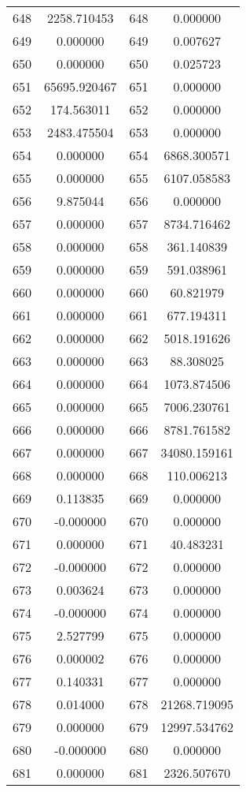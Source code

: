 \documentclass[12pt]{article}
\begin{document}
\begin{longtable}{@{}cccc@{}}
648 & 2258.710453 & 648 & 0.000000 \\
649 & 0.000000 & 649 & 0.007627 \\
650 & 0.000000 & 650 & 0.025723 \\
651 & 65695.920467 & 651 & 0.000000 \\
652 & 174.563011 & 652 & 0.000000 \\
653 & 2483.475504 & 653 & 0.000000 \\
654 & 0.000000 & 654 & 6868.300571 \\
655 & 0.000000 & 655 & 6107.058583 \\
656 & 9.875044 & 656 & 0.000000 \\
657 & 0.000000 & 657 & 8734.716462 \\
658 & 0.000000 & 658 & 361.140839 \\
659 & 0.000000 & 659 & 591.038961 \\
660 & 0.000000 & 660 & 60.821979 \\
661 & 0.000000 & 661 & 677.194311 \\
662 & 0.000000 & 662 & 5018.191626 \\
663 & 0.000000 & 663 & 88.308025 \\
664 & 0.000000 & 664 & 1073.874506 \\
665 & 0.000000 & 665 & 7006.230761 \\
666 & 0.000000 & 666 & 8781.761582 \\
667 & 0.000000 & 667 & 34080.159161 \\
668 & 0.000000 & 668 & 110.006213 \\
669 & 0.113835 & 669 & 0.000000 \\
670 & -0.000000 & 670 & 0.000000 \\
671 & 0.000000 & 671 & 40.483231 \\
672 & -0.000000 & 672 & 0.000000 \\
673 & 0.003624 & 673 & 0.000000 \\
674 & -0.000000 & 674 & 0.000000 \\
675 & 2.527799 & 675 & 0.000000 \\
676 & 0.000002 & 676 & 0.000000 \\
677 & 0.140331 & 677 & 0.000000 \\
678 & 0.014000 & 678 & 21268.719095 \\
679 & 0.000000 & 679 & 12997.534762 \\
680 & -0.000000 & 680 & 0.000000 \\
681 & 0.000000 & 681 & 2326.507670 \\

\end{longtable}
\end{document}
